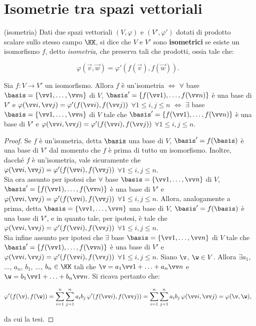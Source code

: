 \section{Isometrie tra spazi vettoriali}

\begin{definition} (isometria)
	Dati due spazi vettoriali $(V, \varphi)$ e
	$(V', \varphi')$ dotati di prodotto scalare sullo stesso campo $\KK$, si dice che
	$V$ e $V'$ sono \textbf{isometrici} se esiste un isomorfismo
	$f$, detto \textit{isometria}, che preserva tali che prodotti, ossia tale che:
	
	\[ \varphi(\vec v, \vec w) = \varphi'(f(\vec v), f(\vec w)). \]
\end{definition}

\vskip 0.01in

\begin{proposition} Sia $f : V \to V'$ un isomorfismo. Allora $f$ è un'isometria $\iff$ $\forall$ base $\basis = \{ \vv 1, \ldots, \vv n \}$ di $V$, $\basis' = \{ f(\vv 1), \ldots, f(\vv n) \}$ è una base di $V'$ e $\varphi(\vv i, \vv j) = \varphi'(f(\vv i), f(\vv j))$ $\forall 1 \leq i, j \leq n$ $\iff$ $\exists$ base $\basis = \{ \vv 1, \ldots, \vv n \}$ di $V$ tale che $\basis' = \{ f(\vv 1), \ldots, f(\vv n) \}$ è una base di $V'$ e $\varphi(\vv i, \vv j) = \varphi'(f(\vv i), f(\vv j))$ $\forall 1 \leq i, j \leq n$.
	\label{prop:isometrie_base_sufficiente}
\end{proposition}

\begin{proof} Se $f$ è un'isometria, detta $\basis$ una base di $V$, $\basis' = f(\basis)$ è una base di $V'$
	dal momento che $f$ è prima di tutto un isomorfismo. Inoltre, dacché $f$ è un'isometria, vale sicuramente che
	$\varphi(\vv i, \vv j) = \varphi'(f(\vv i), f(\vv j))$ $\forall 1 \leq i, j \leq n$. \\
	
	Sia ora assunto per ipotesi che $\forall$ base $\basis = \{ \vv 1, \ldots, \vv n \}$ di $V$, $\basis' = \{ f(\vv 1), \ldots, f(\vv n) \}$ è una base di $V'$ e $\varphi(\vv i, \vv j) = \varphi'(f(\vv i), f(\vv j))$ $\forall 1 \leq i, j \leq n$. Allora, analogamente a prima, detta $\basis = \{ \vv 1, \ldots, \vv n \}$ una base di $V$, $\basis' = f(\basis)$ è una base di $V'$, e in quanto tale,
	per ipotesi, è tale che $\varphi(\vv i, \vv j) = \varphi'(f(\vv i), f(\vv j))$ $\forall 1 \leq i, j \leq n$. \\
	
	Sia infine assunto per ipotesi che $\exists$ base $\basis = \{ \vv 1, \ldots, \vv n \}$ di $V$ tale che $\basis' = \{ f(\vv 1), \ldots, f(\vv n) \}$ è una base di $V'$ e $\varphi(\vv i, \vv j) = \varphi'(f(\vv i), f(\vv j))$ $\forall 1 \leq i, j \leq n$. Siano $\v$, $\w \in V$. Allora $\exists a_1$, ..., $a_n$, $b_1$, ..., $b_n \in \KK$
	tali che $\v = a_1 \vv 1 + \ldots + a_n \vv n$ e $\w = b_1 \vv 1 + \ldots + b_n \vv n$. Si ricava pertanto
	che:
	
	\[ \varphi'(f(\v), f(\w)) = \sum_{i=1}^n \sum_{j=1}^n a_i b_j \, \varphi'(f(\vv i), f(\vv j)) =
	\sum_{i=1}^n \sum_{j=1}^n a_i b_j \, \varphi(\vv i, \vv j) = \varphi(\v, \w), \]
	
	da cui la tesi.
\end{proof}

